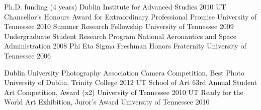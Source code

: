 \begin{cvpress}
  \cvpres
    {Ph.D. funding (4 years)}
    {Dublin Institute for Advanced Studies}
    {2010}
  \cvpres
    {UT Chancellor's Honours Award for Extraordinary Professional Promise}
    {University of Tennessee}
    {2010}
  \cvpres
    {Summer Research Fellowship}
    {University of Tennessee}
    {2009}
  \cvpres
    {Undergraduate Student Research Program}
    {National Aeronautics and Space Administration}
    {2008}
  \cvpres
    {Phi Eta Sigma Freshman Honors Fraternity}
    {University of Tennessee}
    {2006}
\end{cvpress}

\begin{cvpress}
  \cvpres
    {Dublin University Photography Association Camera Competition, Best Photo}
    {University of Dublin, Trinity College}
    {2012}
  \cvpres
    {UT School of Art 63rd Annual Student Art Competition, Award (x2)}
    {University of Tennessee}
    {2010}
  \cvpres
    {UT Ready for the World Art Exhibition, Juror's Award}
    {University of Tennessee}
    {2010}
\end{cvpress}
